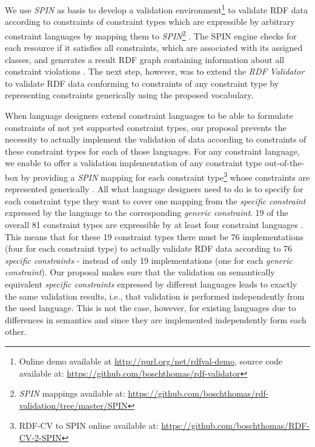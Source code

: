 \documentclass[a4paper,fontsize=11pt]{scrartcl}
\begin{document}
We use \emph{SPIN} as basis to develop a validation environment\footnote{Online demo available at \url{http://purl.org/net/rdfval-demo}, source code available at: \url{https://github.com/boschthomas/rdf-validator}\label{rdf-validator}} to validate RDF data according to constraints of constraint types which are expressible by arbitrary constraint languages by mapping them to \emph{SPIN}\footnote{\emph{SPIN} mappings available at: \url{https://github.com/boschthomas/rdf-validation/tree/master/SPIN}\label{spin-mappings}} \cite{BoschEckert2014-2}.
The SPIN engine checks for each resource if it satisfies all constraints, which are associated with its assigned classes, and generates a result RDF graph containing information about all constraint violations \cite{BoschEckert2014-2}.
The next step, however, was to extend the \emph{RDF Validator} to validate RDF data conforming to constraints of any constraint type
by representing constraints generically using the proposed vocabulary. 
 
When language designers extend constraint languages 
to be able to formulate constraints of not yet supported constraint types,
our proposal prevents the necessity to actually implement the validation of data
according to constraints of these constraint types for each of those languages.  
For any constraint language, we enable to offer a validation implementation of any constraint type out-of-the-box
by providing a \emph{SPIN} mapping
for each constraint type\footnote{RDF-CV to SPIN online available at: \url{https://github.com/boschthomas/RDF-CV-2-SPIN}\label{RDF-CV-2-SPIN}}  
whose constraints are represented generically \cite{BoschEckert2015-2}.
All what language designers need to do is to specify for each constraint type they want to cover one mapping from the \emph{specific constraint} expressed by the language to the corresponding \emph{generic constraint}.
19 of the overall 81 constraint types are expressible by at least four constraint languages \cite{BoschNolleAcarEckert2015}.
This means that for these 19 constraint types there must be 76 implementations (four for each constraint type) to actually validate RDF data according to 76 \emph{specific constraints} - instead of only 19 implementations (one for each \emph{generic constraint}). 
Our proposal makes sure that the validation on semantically equivalent \emph{specific constraints} expressed by different languages
leads to exactly the same validation results, 
i.e., that validation is performed independently from the used language.
This is not the case, however, for existing languages due to differences in semantics and since they are implemented independently form each other.
\end{document}
